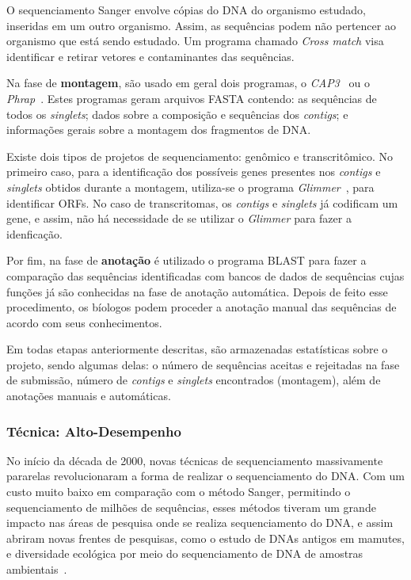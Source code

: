 O sequenciamento Sanger envolve cópias do DNA do organismo estudado, inseridas em um outro organismo. Assim, as sequências podem não pertencer ao organismo que está sendo estudado. Um programa chamado \textit{Cross match} visa identificar e retirar vetores e contaminantes das sequências. 
  

Na fase de \textbf{montagem}, são usado em geral dois programas, o \textit{CAP3}~\citep{huang1999cap3:1999} ou o \textit{Phrap}~\citep{green1994phrap:1994}. Estes programas geram arquivos FASTA contendo: as sequências de todos os \textit{singlets}; dados sobre a composição e sequências dos \textit{contigs}; e informações gerais sobre a montagem dos fragmentos de DNA.

Existe dois tipos de projetos de sequenciamento: genômico e transcritômico. No primeiro caso, para a identificação dos possíveis genes presentes nos \textit{contigs} e \textit{singlets} obtidos durante a montagem, utiliza-se o programa \textit{Glimmer}~\citep{salzberg1998microbial:1998}, para identificar ORFs. No caso de transcritomas, os \textit{contigs} e \textit{singlets} já codificam um gene, e assim, não há necessidade de se utilizar o \textit{Glimmer} para fazer a idenficação.


Por fim, na fase de \textbf{anotação} é utilizado o programa BLAST para fazer a comparação das sequências identificadas com bancos de dados de sequências cujas funções já são conhecidas na fase de anotação automática. Depois de feito esse procedimento, os bíologos podem proceder a anotação manual das sequências de acordo com seus conhecimentos.


Em todas etapas anteriormente descritas, são armazenadas estatísticas sobre o projeto, sendo algumas delas: o número de sequências aceitas e rejeitadas na fase de submissão, número de \textit{contigs} e \textit{singlets} encontrados (montagem), além de anotações manuais e automáticas.  


\subsubsection{Técnica: Alto-Desempenho} \label{sec:Sequenciamento}


No início da década de 2000, novas técnicas de sequenciamento massivamente pararelas revolucionaram a forma de realizar o sequenciamento do DNA. Com um custo muito baixo em comparação com o método Sanger, permitindo o sequenciamento de milhões de sequências, esses métodos tiveram um grande impacto nas áreas de pesquisa onde se realiza sequenciamento do DNA, e assim abriram novas frentes de pesquisas, como o estudo de DNAs antigos em mamutes, e diversidade ecológica por meio do sequenciamento de DNA de amostras ambientais~\citep{mardis2008next:2008}.

